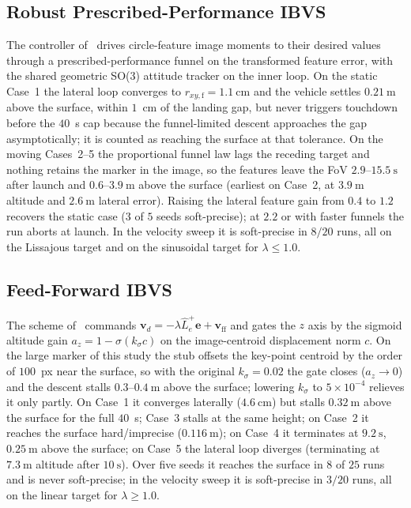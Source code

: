 \documentclass{IEEEtaes}
\theoremstyle{definition}
\theoremstyle{remark}
\begin{document}
\subsection{Robust Prescribed-Performance IBVS \cite{lin2023}}
The controller of~\cite{lin2023} drives circle-feature image moments to their desired values through a prescribed-performance funnel on the transformed feature error, with the shared geometric SO(3) attitude tracker on the inner loop. On the static Case~1 the lateral loop converges to $r_{xy,\text{f}}=1.1~\text{cm}$ and the vehicle settles $0.21~\text{m}$ above the surface, within $1$~cm of the landing gap, but never triggers touchdown before the $40$~s cap because the funnel-limited descent approaches the gap asymptotically; it is counted as reaching the surface at that tolerance. On the moving Cases~2--5 the proportional funnel law lags the receding target and nothing retains the marker in the image, so the features leave the FoV $2.9$--$15.5~\text{s}$ after launch and $0.6$--$3.9~\text{m}$ above the surface (earliest on Case~2, at $3.9~\text{m}$ altitude and $2.6~\text{m}$ lateral error). Raising the lateral feature gain from $0.4$ to $1.2$ recovers the static case ($3$ of $5$ seeds soft-precise); at $2.2$ or with faster funnels the run aborts at launch. In the velocity sweep it is soft-precise in $8/20$ runs, all on the Lissajous target and on the sinusoidal target for $\lambda\le1.0$.

\subsection{Feed-Forward IBVS \cite{cho2022}}
The scheme of~\cite{cho2022} commands $\boldsymbol{v}_d=-\lambda\hat{L}_e^+\boldsymbol{e}+\boldsymbol{v}_{\text{ff}}$ and gates the $z$ axis by the sigmoid altitude gain $a_z=1-\sigma(k_\sigma c)$ on the image-centroid displacement norm $c$. On the large marker of this study the stub offsets the key-point centroid by the order of $100$~px near the surface, so with the original $k_\sigma=0.02$ the gate closes ($a_z\to0$) and the descent stalls $0.3$--$0.4~\text{m}$ above the surface; lowering $k_\sigma$ to $5{\times}10^{-4}$ relieves it only partly. On Case~1 it converges laterally ($4.6~\text{cm}$) but stalls $0.32~\text{m}$ above the surface for the full $40$~s; Case~3 stalls at the same height; on Case~2 it reaches the surface hard/imprecise ($0.116~\text{m}$); on Case~4 it terminates at $9.2~\text{s}$, $0.25~\text{m}$ above the surface; on Case~5 the lateral loop diverges (terminating at $7.3~\text{m}$ altitude after $10~\text{s}$). Over five seeds it reaches the surface in $8$ of $25$ runs and is never soft-precise; in the velocity sweep it is soft-precise in $3/20$ runs, all on the linear target for $\lambda\ge1.0$.
\end{document}
